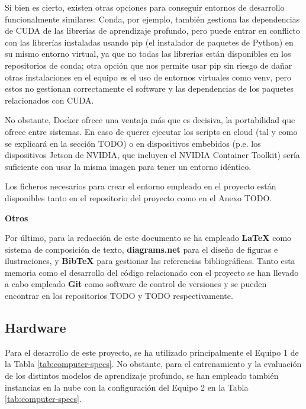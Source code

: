 Si bien es cierto, existen otras opciones para conseguir entornos de desarrollo funcionalmente similares: Conda, por ejemplo, también gestiona las dependencias de CUDA de las librerías de aprendizaje profundo, pero puede entrar en conflicto con las librerías instaladas usando pip (el instalador de paquetes de Python) en su mismo entorno virtual, ya que no todas las librerías están disponibles en los repositorios de conda; otra opción que nos permite usar pip sin riesgo de dañar otras instalaciones en el equipo es el uso de entornos virtuales como venv, pero estos no gestionan correctamente el software y las dependencias de los paquetes relacionados con CUDA. 

No obstante, Docker ofrece una ventaja más que es decisiva, la portabilidad que ofrece entre sistemas. En caso de querer ejecutar los scripts en cloud (tal y como se explicará en la sección TODO) o en dispositivos embebidos (p.e. los dispositivos Jetson de NVIDIA, que incluyen el NVIDIA Container Toolkit) sería suficiente con usar la misma imagen para tener un entorno idéntico. 

Los ficheros necesarios para crear el entorno empleado en el proyecto están disponibles tanto en el repositorio del proyecto como en el Anexo TODO.


\textbf{Otros}

Por último, para la redacción de este documento se ha empleado \textbf{LaTeX} como sistema de composición de texto, \textbf{diagrams.net} para el diseño de figuras e ilustraciones, y \textbf{BibTeX} para gestionar las referencias bibliográficas. Tanto esta memoria como el desarrollo del código relacionado con el proyecto se han llevado a cabo empleado \textbf{Git} como software de control de versiones y se pueden encontrar en los repositorios TODO y TODO respectivamente.


\subsection{Hardware}
Para el desarrollo de este proyecto, se ha utilizado principalmente el Equipo 1 de la Tabla \ref{tab:computer-specs}. No obstante, para el entrenamiento y la evaluación de los distintos modelos de aprendizaje profundo, se han empleado también instancias en la nube con la configuración del Equipo 2 en la Tabla \ref{tab:computer-specs}.

